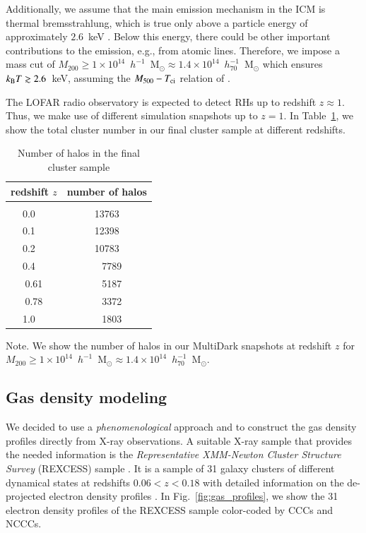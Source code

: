 \documentclass[useAMS,usenatbib]{mn2e}
\begin{document}
Additionally, we assume that the main emission mechanism in the ICM is thermal
bremsstrahlung, which is true only above a particle energy of approximately
$2.6$~keV \citep{1988xrec.book.....S}. Below this
energy, there could be other important contributions to the emission,
e.g., from atomic lines. Therefore, we impose a mass cut of
$M_{200}\geq1\times10^{14}$~$h^{-1}$~M$_{\odot}\approx1.4\times10^{14}$~$h_{70}^{-1}$~M$_{\odot}$
which ensures $k_{{\mathrm{B}}}T \gtrsim 2.6$~keV, assuming the $M_{500} - T_{{\mathrm{ci}}}$ relation
of \cite{2010MNRAS.406.1773M}.

The LOFAR radio observatory is expected to detect RHs up to redshift $z \approx
1$. Thus, we make use of different simulation snapshots up to $z=1$. In
Table~\ref{tab:z}, we show the total cluster number in our final cluster sample
at different redshifts.

\begin{table} 
\begin{center}
\caption{Number of halos in the final cluster sample}
\medskip
\begin{tabular}{cc}
\hline
\phantom{\Big|}
redshift $z$ & number of halos \\
\hline\\[-0.5em]
 0.0~~ &  13763\\
 0.1~~ &  12398\\
 0.2~~ &  10783\\ 
 0.4~~ &   ~~7789\\ 
 0.61  &  ~~5187\\ 
 0.78  &  ~~3372\\ 
 1.0~~ &  ~~1803\\[0.5em]
\hline
\end{tabular}
\label{tab:z}
\end{center}
\footnotesize{Note. We show the number of halos in our MultiDark snapshots at redshift $z$ for $M_{200}\geq1\times10^{14}$~$h^{-1}$~M$_{\odot}\approx1.4\times10^{14}$~$h_{70}^{-1}$~M$_{\odot}$. }
\end{table}


\subsection{Gas density modeling}
\label{sec:2.2}

We decided to use a \emph{phenomenological} approach and to construct the gas
density profiles directly from X-ray observations. A suitable X-ray sample that
provides the needed information is the \emph{Representative XMM-Newton Cluster
  Structure Survey} (REXCESS) sample \citep{2008A&A...487..431C,
  2009A&A...498..361P}. It is a sample of 31 galaxy clusters of different
dynamical states at redshifts $0.06<z<0.18$ with detailed information on the
de-projected electron density profiles \citep{2008A&A...487..431C}. In
Fig.~\ref{fig:gas_profiles}, we show the 31 electron density profiles of the
REXCESS sample color-coded by CCCs and NCCCs.
\end{document}
